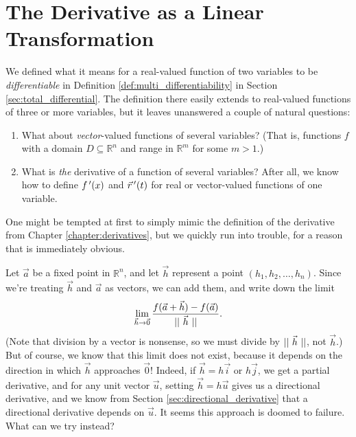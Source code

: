 \section{The Derivative as a Linear Transformation}\label{sec:deriv_matrix}
We defined what it means for a real-valued function of two variables to be \emph{differentiable} in Definition \ref{def:multi_differentiability} in Section \ref{sec:total_differential}. The definition there easily extends to real-valued functions of three or more variables, but it leaves unanswered a couple of natural questions:
\begin{enumerate}
\item What about \emph{vector}-valued functions of several variables? (That is, functions $f$ with a domain $D\subseteq \mathbb{R}^n$ and range in $\mathbb{R}^m$ for some $m >1$.)
\item What is \emph{the} derivative of a function of several variables? After all, we know how to define $f\,'(x)$ and $\vec r\, '(t)$ for real or vector-valued functions of one variable.
\end{enumerate}
One might be tempted at first to simply mimic the definition of the derivative from Chapter \ref{chapter:derivatives}, but we quickly run into trouble, for a reason that is immediately obvious. 


Let $\vec{a}$ be a fixed point in $\mathbb{R}^n$, and let $\vec{h}$ represent a point $(h_1,h_2,\ldots, h_n)$. Since we're treating $\vec{h}$ and $\vec{a}$ as vectors, we can add them, and write down the limit
\[
\lim_{\vec{h}\to\vec{0}}\frac{f(\vec{a}+\vec{h})-f(\vec{a})}{||\ \vec{h}\ ||}.
\]
(Note that division by a vector is nonsense, so we must divide by $||\ \vec{h}\ ||$, not $\vec{h}$.) But of course, we know that this limit does not exist, because it depends on the direction in which $\vec{h}$ approaches $\vec{0}$! Indeed, if $\vec{h} = h\vec{i}$ or $h\vec{j}$, we get a partial derivative, and for any unit vector $\vec{u}$, setting $\vec{h}=h\vec{u}$ gives us a directional derivative, and we know from Section \ref{sec:directional_derivative} that a directional derivative depends on $\vec{u}$. It seems this approach is doomed to failure. What can we try instead?

